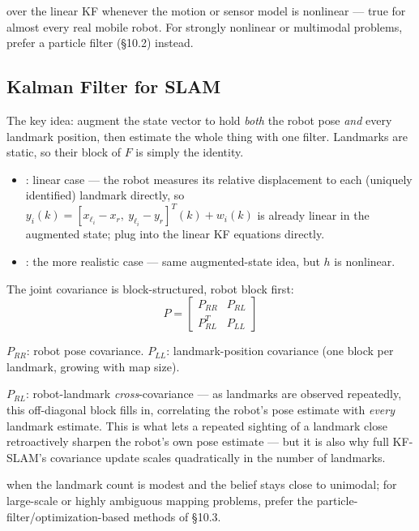 
 over the linear KF whenever the motion or sensor model is nonlinear --- true for almost every real mobile robot. For strongly nonlinear or multimodal problems, prefer a particle filter (\S10.2) instead.

\subsection{Kalman Filter for SLAM}
The key idea: augment the state vector to hold \emph{both} the robot pose \emph{and} every landmark position, then estimate the whole thing with one filter. Landmarks are static, so their block of $F$ is simply the identity.
\begin{itemize}
\item {}: linear case --- the robot measures its relative displacement to each (uniquely identified) landmark directly, so $y_i(k)=[x_{\ell_i}-x_r,\ y_{\ell_i}-y_r]^T(k)+w_i(k)$ is already linear in the augmented state; plug into the linear KF equations directly.
\item {}: the more realistic case --- same augmented-state idea, but $h$ is nonlinear.
\end{itemize}
The joint covariance is block-structured, robot block first:
\[
P=\begin{bmatrix}P_{RR}&P_{RL}\\P_{RL}^T&P_{LL}\end{bmatrix}
\]
\begin{notebox}
$P_{RR}$: robot pose covariance. $P_{LL}$: landmark-position covariance (one block per landmark, growing with map size). 

$P_{RL}$: robot-landmark \emph{cross}-covariance --- as landmarks are observed repeatedly, this off-diagonal block fills in, correlating the robot's pose estimate with \emph{every} landmark estimate. This is what lets a repeated sighting of a landmark close retroactively sharpen the robot's own pose estimate  --- but it is also why full KF-SLAM's covariance update scales quadratically in the number of landmarks.
\end{notebox}
 when the landmark count is modest and the belief stays close to unimodal; for large-scale or highly ambiguous mapping problems, prefer the particle-filter/optimization-based methods of \S10.3.

